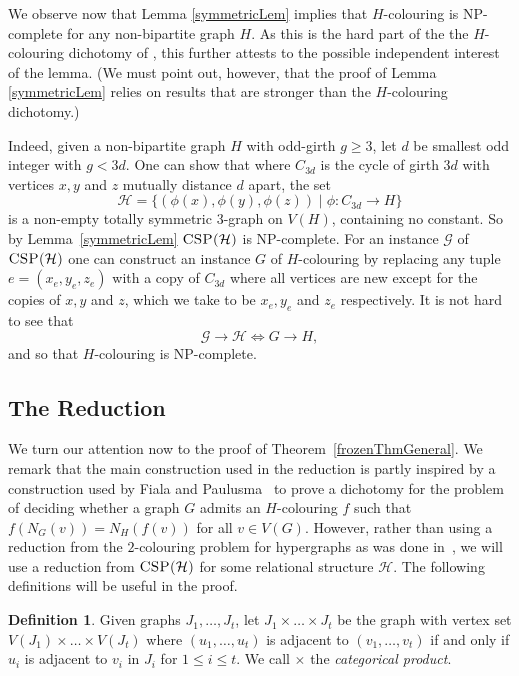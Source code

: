 \documentclass[11 pt]{amsart}
\theoremstyle{definition}
\newtheorem{defn}[equation]{Definition}
\theoremstyle{case}
\numberwithin{equation}{section}
\newcommand\CSP[1]{\textsc{CSP($#1$)}}
\begin{document}
We observe now that Lemma \ref{symmetricLem} implies that $H$-colouring is NP-complete for any
non-bipartite graph $H$. As this is the hard part of the the $H$-colouring dichotomy of
\cite{Hcol}, this further attests to the possible independent interest of the lemma. (We must point
out, however, that the proof of Lemma \ref{symmetricLem} relies on results that are stronger than
the $H$-colouring dichotomy.)

Indeed, given a non-bipartite graph $H$ with odd-girth $g \geq 3$, let $d$ be  
smallest odd integer with $g < 3d$. One can show that where $C_{3d}$ is the cycle of girth $3d$
with vertices $x,y$ and $z$ mutually distance $d$ apart, the set
\[ \mathcal{H} = \{ (\phi(x), \phi(y), \phi(z) ) \mid \phi: C_{3d} \to H \} \]
is a non-empty totally symmetric $3$-graph on $V(H)$, containing no constant. So by
Lemma~\ref{symmetricLem}
$\CSP{\mathcal{H}}$ is NP-complete.  For an instance $\mathcal{G}$ of $\CSP{\mathcal{H}}$ one can
construct an instance $G$ of $H$-colouring by replacing any tuple $e = (x_e,y_e,z_e)$ with a copy
of $C_{3d}$ where all vertices are new except for the copies of $x,y$ and $z$, which we take to
be $x_e,y_e$ and $z_e$ respectively.  It is not hard to see that
\[ \mathcal{G} \to \mathcal{H} \iff G \to H, \]
and so that $H$-colouring is NP-complete. 




\subsection{The Reduction}

We turn our attention now to the proof of Theorem~\ref{frozenThmGeneral}. We remark that the main construction used in the reduction is partly inspired by a construction used by Fiala and Paulusma~\cite{Fiala} to prove a dichotomy for the problem of deciding whether a graph $G$ admits an $H$-colouring $f$ such that $f\left(N_G(v)\right) = N_H\left(f(v)\right)$ for all $v\in V(G)$. However, rather than using a reduction from the $2$-colouring problem for hypergraphs as was done in~\cite{Fiala}, we will use a reduction from $\CSP{\mathcal{H}}$ for some relational structure $\mathcal{H}$. The following definitions will be useful in the proof.

\begin{defn}
\label{catProdDef}
Given graphs $J_1,\dots,J_t$, let $J_1\times\dots\times J_t$ be the graph with vertex set $V(J_1)\times \dots \times V(J_t)$ where $(u_1,\dots,u_t)$ is adjacent to $(v_1,\dots,v_t)$ if and only if $u_i$ is adjacent to $v_i$ in $J_i$ for $1\leq i\leq t$. We call $\times$ the \emph{categorical product}. 
\end{defn}
\end{document}
